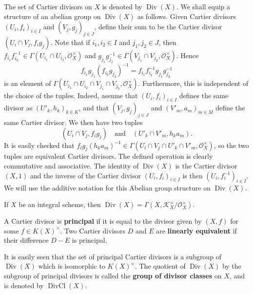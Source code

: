 \documentclass[12pt]{book}
\newcommand{\inlinedef}[1]{\textcolor{oxfordblue}{\bfseries #1}}
\theoremstyle{definition}
\newcommand{\Div}{\operatorname{Div}}
\newcommand{\DivCl}{\operatorname{DivCl}}
\begin{document}
	The set of Cartier divisors on $X$ is denoted by $\Div(X)$. We shall equip a structure of an abelian group on $\Div(X)$ as follows. Given Cartier divisors $(U_i, f_i)_{i \in I}$ and $(V_j, g_j)_{j \in J}$, define their sum to be the Cartier divisor $(U_i \cap V_j, f_i g_j)$. Note that if $i_1, i_2 \in I$ and $j_1, j_2 \in J$, then $f_{i_1} f_{i_2}^{-1} \in \Gamma(U_{i_1} \cap U_{i_2}, \mathcal{O}_X^\times)$ and $g_{j_1} g_{j_2}^{-1} \in \Gamma(V_{j_1} \cap V_{j_2}, \mathcal{O}_X^\times)$. Hence
	\begin{equation*}
		f_{i_1}g_{j_1}(f_{i_2}g_{j_2})^{-1} = f_{i_1}f_{i_2}^{-1}g_{j_1}g_{j_2}^{-1}
	\end{equation*}
	is an element of $\Gamma(U_{i_1} \cap U_{i_2} \cap V_{j_1} \cap V_{j_2}, \mathcal{O}_X^\times)$. Furthermore, this is independent of the choice of the tuples. Indeed, assume that $(U_i, f_i)_{i \in I}$ defines the same divisor as $(U'_k, h_k)_{k \in K}$, and that $(V_j, g_j)_{j \in J}$ and $(V'_m, a_m)_{m \in M}$ define the same Cartier divisor. We then have two tuples
	\begin{equation*}
		(U_i \cap V_j, f_ig_j) \quad\text{and}\quad (U'_k \cap V'_m, h_ka_m).
	\end{equation*}
	It is easily checked that $f_ig_j(h_ka_m)^{-1} \in \Gamma(U_i \cap V_j \cap U'_k \cap V'_m, \mathcal{O}_X^\times)$, so the two tuples are equivalent Cartier divisors. The defined operation is clearly commutative and associative. The identity of $\Div(X)$ is the Cartier divisor $(X, 1)$ and the inverse of the Cartier divisor $(U_i, f_i)_{i \in I}$ is then $(U_i, f_i^{-1})_{i \in I}$. We will use the additive notation for this Abelian group structure on $\Div(X)$.
	
	\begin{remark}
		If $X$ be an integral scheme, then $\Div(X) = \Gamma(X, \mathcal{K}_X^\times/\mathcal{O}_X^\times)$.
	\end{remark}
	
	\begin{definition}
		A Cartier divisor is \inlinedef{principal} if it is equal to the divisor given by $(X, f)$ for some $f \in K(X)^\times$. Two Cartier divisors $D$ and $E$ are \inlinedef{linearly equivalent} if their difference $D - E$ is principal.
	\end{definition}
	
	It is easily seen that the set of principal Cartier divisors is a subgroup of $\Div(X)$ which is isomorphic to $K(X)^\times$. The quotient of $\Div(X)$ by the subgroup of principal divisors is called the \inlinedef{group of divisor classes} on $X$, and is denoted by $\DivCl(X)$.
	
\end{document}

